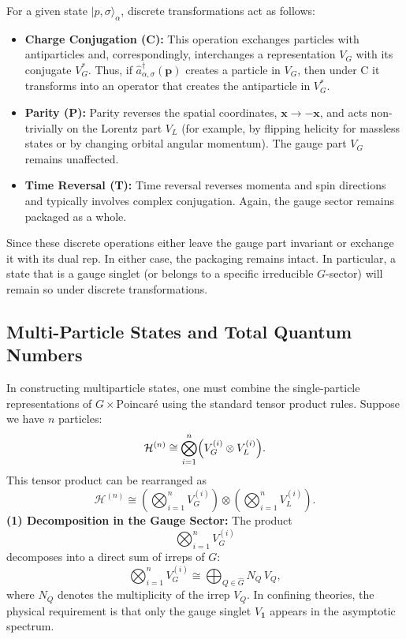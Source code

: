 \documentclass[12pt,a4paper]{article}
\begin{document}
For a given state $|p,\sigma\rangle_\alpha$, discrete transformations act as follows:
\begin{itemize}
	\item \textbf{Charge Conjugation (C):}  
	This operation exchanges particles with antiparticles and, correspondingly, interchanges a representation $V_G$ with its conjugate $V_G^*$. Thus, if $\hat{a}^\dagger_{\alpha,\sigma}(\mathbf{p})$ creates a particle in $V_G$, then under C it transforms into an operator that creates the antiparticle in $V_G^*$.
	
	\item \textbf{Parity (P):}  
	Parity reverses the spatial coordinates, $ \mathbf{x} \to -\mathbf{x} $, and acts non-trivially on the Lorentz part $V_L$ (for example, by flipping helicity for massless states or by changing orbital angular momentum). The gauge part $V_G$ remains unaffected.
	
	\item \textbf{Time Reversal (T):}  
	Time reversal reverses momenta and spin directions and typically involves complex conjugation. Again, the gauge sector remains packaged as a whole.
\end{itemize}
Since these discrete operations either leave the gauge part invariant or exchange it with its dual rep.
In either case, the packaging remains intact.
In particular, a state that is a gauge singlet (or belongs to a specific irreducible $G$-sector) will remain so under discrete transformations.



\subsection{Multi-Particle States and Total Quantum Numbers}

In constructing multiparticle states, one must combine the single-particle representations of $G \times \mathrm{Poincaré}$ using the standard tensor product rules.
Suppose we have $n$ particles:
\[
\mathcal{H}^{(n)} \cong \bigotimes_{i=1}^n \Bigl(V_{G}^{(i)} \otimes V_{L}^{(i)}\Bigr).
\]
This tensor product can be rearranged as
\[
\mathcal{H}^{(n)} \cong \left(\bigotimes_{i=1}^n V_{G}^{(i)}\right) \otimes \left(\bigotimes_{i=1}^n V_{L}^{(i)}\right).
\]
\textbf{(1) Decomposition in the Gauge Sector:}  
The product
\[
\bigotimes_{i=1}^n V_{G}^{(i)}
\]
decomposes into a direct sum of irreps of $G$:
\[
\bigotimes_{i=1}^n V_{G}^{(i)} \cong \bigoplus_{Q\in\hat{G}} N_Q\, V_Q,
\]
where $N_Q$ denotes the multiplicity of the irrep $V_Q$.
In confining theories, the physical requirement is that only the gauge singlet $V_{\mathbf{1}}$ appears in the asymptotic spectrum.
\end{document}
